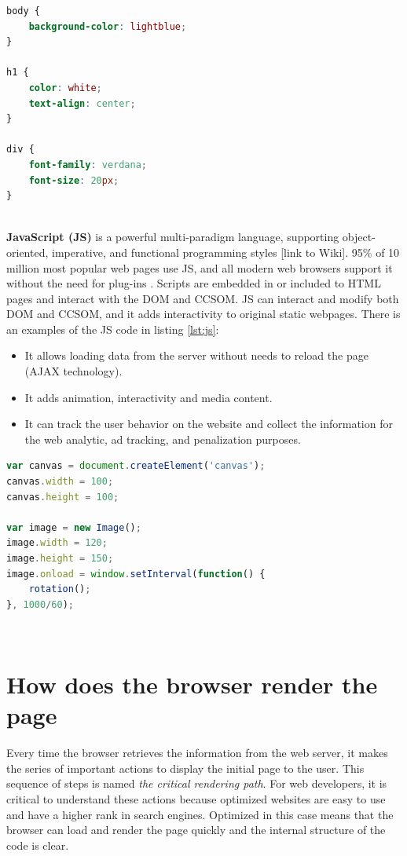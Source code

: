 \begin{lstlisting}[language=css, caption={Small example of CSS file}, label={lst:css}, captionpos=b]
body {
    background-color: lightblue;
}

h1 {
    color: white;
    text-align: center;
}

div {
    font-family: verdana;
    font-size: 20px;
}
\end{lstlisting}\\

\noindent\textbf{JavaScript (JS)} is a powerful multi-paradigm language, supporting object-oriented, imperative, and functional programming styles [link to Wiki]. 95\% of 10 million most popular web pages use JS, and all modern web browsers support it without the need for plug-ins \cite{W3Schools}. Scripts are embedded in or included to HTML pages and interact with the DOM and CCSOM. JS can interact and modify both DOM and CCSOM, and it adds interactivity to original static webpages. There is an examples of the JS code in listing \ref{lst:js}:

\begin{itemize}
    \item It allows loading data from the server without needs to reload the page (AJAX technology).
    \item It adds animation, interactivity and media content.
    \item It can track the user behavior on the website and collect the information for the web analytic, ad tracking, and penalization purposes.
\end{itemize}

\begin{lstlisting}[language=JavaScript, caption={Small example of JavaScript code}, label={lst:js}, captionpos=b]
var canvas = document.createElement('canvas');
canvas.width = 100;
canvas.height = 100;

var image = new Image();
image.width = 120;
image.height = 150;
image.onload = window.setInterval(function() {
    rotation();
}, 1000/60);
\end{lstlisting}\\


\section{How does the browser render the page}
\label{sec:browser}

Every time the browser retrieves the information from the web server, it makes the series of important actions to display the initial page to the user. This sequence of steps is named \textit{the critical rendering path}\cite{GoogleDev}. For web developers, it is critical to understand these actions because optimized websites are easy to use and have a higher rank in search engines. Optimized in this case means that the browser can load and render the page quickly and the internal structure of the code is clear.\\

